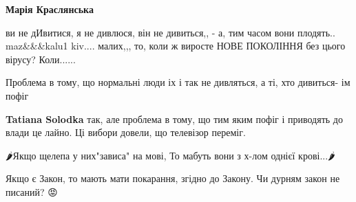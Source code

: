 \begin{itemize}
\begin{itemize}
 
\textbf{Марія Краслянська} 

ви не дИвитися, я не дивлюся, він не дивиться,, - а,
тим часом вони плодять.. maz\&\&\&kalu1 kiv.... малих,,, то, коли ж виросте НОВЕ
ПОКОЛІННЯ без цього вірусу? Коли......
\end{itemize}

 

Проблема в тому, що нормальні люди іх і так не дивляться, а ті, хто дивиться-
ім пофіг

\begin{itemize}
 
\textbf{Tatiana Solodka} так, але проблема в тому, що тим яким пофіг і приводять до влади це лайно. Ці вибори довели, що телевізор переміг.
\end{itemize}

 
🌶Якщо щелепа у них"зависа" на мові,
То мабуть вони з х-лом однієї крові...🌶

 
Якщо є Закон, то мають мати покарання, згідно до Закону.
Чи дурням закон не писаний? 😡

 

\end{itemize}
